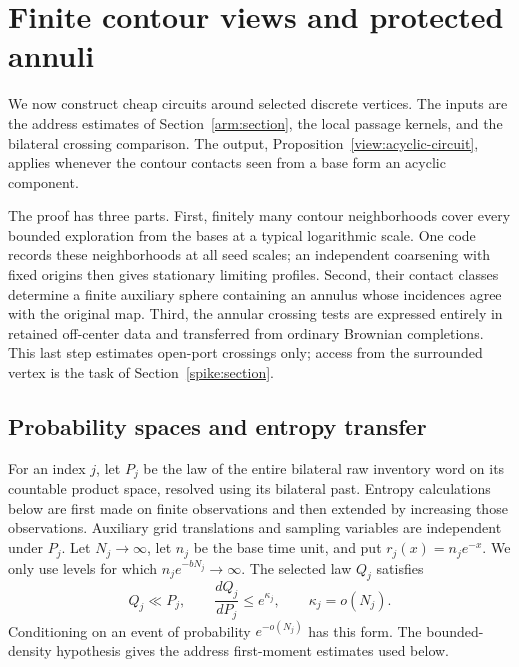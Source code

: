 \section{Finite contour views and protected annuli}
\label{view:section}

We now construct cheap circuits around selected discrete vertices.  The
inputs are the address estimates of Section~\ref{arm:section}, the local
passage kernels, and the bilateral crossing comparison.  The output,
Proposition~\ref{view:acyclic-circuit}, applies whenever the contour
contacts seen from a base form an acyclic component.

The proof has three parts.  First, finitely many contour neighborhoods
cover every bounded exploration from the bases at a typical logarithmic
scale.  One code records these neighborhoods at all seed scales; an
independent coarsening with fixed origins then gives stationary limiting
profiles.  Second, their contact classes determine a finite auxiliary
sphere containing an annulus whose incidences agree with the original
map.  Third, the annular crossing tests are expressed entirely in
retained off-center data and transferred from ordinary Brownian
completions.  This last step estimates open-port crossings only; access
from the surrounded vertex is the task of Section~\ref{spike:section}.

\subsection{Probability spaces and entropy transfer}

For an index $j$, let $P_j$ be the law of the entire bilateral raw inventory
word on its countable product space, resolved using its bilateral past.
Entropy calculations below are first made on finite observations and then
extended by increasing those observations.  Auxiliary grid translations and sampling variables
are independent under $P_j$.  Let $N_j\to\infty$, let $n_j$ be the base time
unit, and put $r_j(x)=n_j e^{-x}$.  We only use levels for which
$n_j e^{-bN_j}\to\infty$.  The selected law $Q_j$ satisfies
\begin{equation}\label{view:selection}
 Q_j\ll P_j,\qquad \frac{dQ_j}{dP_j}\le e^{\kappa_j},
 \qquad \kappa_j=o(N_j).
\end{equation}
Conditioning on an event of probability $e^{-o(N_j)}$ has this form.
The bounded-density hypothesis gives the address first-moment estimates
used below.

